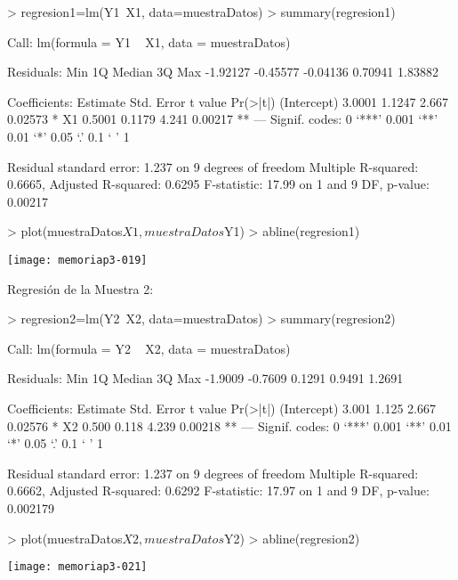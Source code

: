 \documentclass [a4paper] {article}
\begin{document}
\begin{Schunk}
\begin{Sinput}
> regresion1=lm(Y1~X1, data=muestraDatos)
> summary(regresion1)
\end{Sinput}
\begin{Soutput}
Call:
lm(formula = Y1 ~ X1, data = muestraDatos)

Residuals:
     Min       1Q   Median       3Q      Max 
-1.92127 -0.45577 -0.04136  0.70941  1.83882 

Coefficients:
            Estimate Std. Error t value Pr(>|t|)   
(Intercept)   3.0001     1.1247   2.667  0.02573 * 
X1            0.5001     0.1179   4.241  0.00217 **
---
Signif. codes:  0 ‘***’ 0.001 ‘**’ 0.01 ‘*’ 0.05 ‘.’ 0.1 ‘ ’ 1

Residual standard error: 1.237 on 9 degrees of freedom
Multiple R-squared:  0.6665,	Adjusted R-squared:  0.6295 
F-statistic: 17.99 on 1 and 9 DF,  p-value: 0.00217
\end{Soutput}
\end{Schunk}
\begin{Schunk}
\begin{Sinput}
> plot(muestraDatos$X1, muestraDatos$Y1)
> abline(regresion1)
\end{Sinput}
\end{Schunk}
\texttt{[image: memoriap3-019]}

Regresión de la Muestra 2:

\begin{Schunk}
\begin{Sinput}
> regresion2=lm(Y2~X2, data=muestraDatos)
> summary(regresion2)
\end{Sinput}
\begin{Soutput}
Call:
lm(formula = Y2 ~ X2, data = muestraDatos)

Residuals:
    Min      1Q  Median      3Q     Max 
-1.9009 -0.7609  0.1291  0.9491  1.2691 

Coefficients:
            Estimate Std. Error t value Pr(>|t|)   
(Intercept)    3.001      1.125   2.667  0.02576 * 
X2             0.500      0.118   4.239  0.00218 **
---
Signif. codes:  0 ‘***’ 0.001 ‘**’ 0.01 ‘*’ 0.05 ‘.’ 0.1 ‘ ’ 1

Residual standard error: 1.237 on 9 degrees of freedom
Multiple R-squared:  0.6662,	Adjusted R-squared:  0.6292 
F-statistic: 17.97 on 1 and 9 DF,  p-value: 0.002179
\end{Soutput}
\end{Schunk}
\begin{Schunk}
\begin{Sinput}
> plot(muestraDatos$X2, muestraDatos$Y2)
> abline(regresion2)
\end{Sinput}
\end{Schunk}
\texttt{[image: memoriap3-021]}
\end{document}
